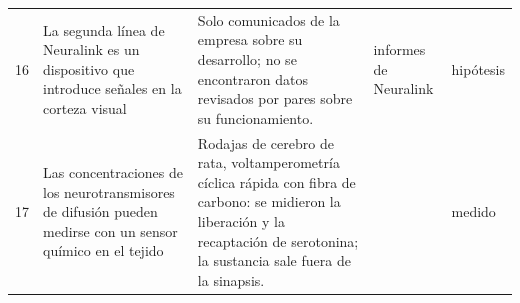 {\begin{longtable}{>{\raggedright}p{0.5cm}>{\raggedright}p{4.0cm}>{\raggedright}p{5.6cm}>{\raggedright}p{2.3cm}>{\raggedright\arraybackslash}p{1.7cm}}
16 & La segunda línea de Neuralink es un dispositivo que introduce señales en la corteza visual & Solo comunicados de la empresa sobre su desarrollo; no se encontraron datos revisados por pares sobre su funcionamiento. & informes de Neuralink & hipótesis \\
17 & Las concentraciones de los neurotransmisores de difusión pueden medirse con un sensor químico en el tejido & Rodajas de cerebro de rata, voltamperometría cíclica rápida con fibra de carbono: se midieron la liberación y la recaptación de serotonina; la sustancia sale fuera de la sinapsis. & \cite{Bunin1998} & medido \\
\bottomrule
\end{longtable}}
